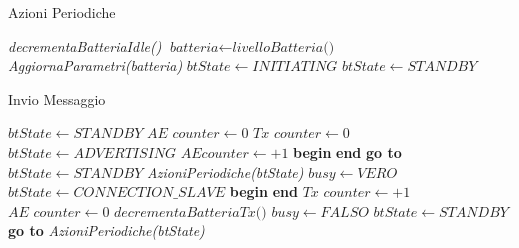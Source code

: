 \bigskip
\begin{algorithm}[bh]
	\caption{Azioni Periodiche}\label{alg:periodic_actions}
	\begin{algorithmic}[1]
			\State \textit{decrementaBatteriaIdle()}
			\State $ \textit{batteria} \gets \textit{livelloBatteria() } $
				\State \textit{AggiornaParametri(\textit{batteria})}
					\State $ \textit{btState} \gets INITIATING $
				\EndIf
			\Else
				\State $ \textit{btState} \gets STANDBY $
			\EndIf
		\EndFunction
	\end{algorithmic}
\end{algorithm}
\bigskip
\begin{algorithm}[hp]
	\caption{Invio Messaggio}\label{alg:invia_msg}
	\begin{algorithmic}[1]
				\State $ \textit{btState} \gets STANDBY$
			\EndIf
		\State $ \textit{AE counter} \gets 0 $ 
		\State $ \textit{Tx counter} \gets 0 $ 
		\Label {}
		\State $ \textit{btState} \gets ADVERTISING$
		\State $ AE counter \gets +1 $
		\State \textbf{begin}
			\State\hspace{\algorithmicindent}{ADVERTISING EVENT}
		\State \textbf{end}
				\State \textbf{go to} 
			\Else
				\State $btState \gets STANDBY$
				\State \textit{AzioniPeriodiche(btState)}
			\EndIf
		\EndIf
		\State $ \textit{busy}\gets VERO $
		\State $\textit{btState}\gets CONNECTION\_SLAVE$
		\State \textbf{begin}
			\State\hspace{\algorithmicindent}{CONNECTION EVENT}
		\State \textbf{end}
		\State $\textit{Tx counter}\gets +1$
		\State $\textit{AE counter}\gets 0$
		\State $ \textit{decrementaBatteriaTx()}$
		\State $\textit{busy}\gets FALSO$
		\State $ \textit{btState}\gets STANDBY $
			\State \textbf{go to} 
		\Else
			\State \textit{AzioniPeriodiche(btState)}
		\EndIf
		\EndFunction
	\end{algorithmic}
\end{algorithm}
\bigskip

